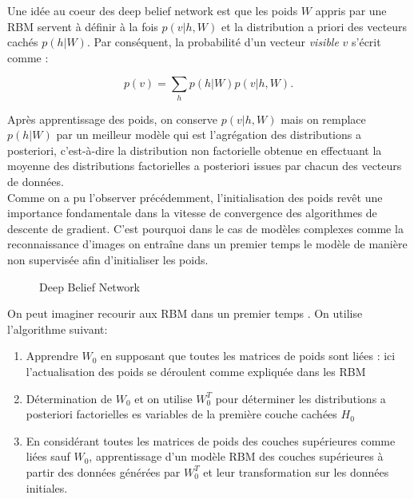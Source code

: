 \documentclass{article}
\theoremstyle{definition}
\begin{document}
\noindent Une idée au coeur des deep belief network est que les poids $W$ appris par une RBM servent à définir à la fois $p(v|h,W)$ et la distribution a priori des vecteurs cachés $p(h|W)$. Par conséquent, la probabilité d'un vecteur \textit{visible} $v$ s'écrit comme :

\[p(v)=\displaystyle \sum_h p(h|W)p(v|h,W).\]

\noindent Après apprentissage des poids, on conserve $p(v|h,W)$ mais on remplace $p(h|W)$ par un meilleur modèle qui est l'agrégation des distributions a posteriori, c'est-à-dire la distribution non factorielle obtenue en effectuant la moyenne des distributions factorielles a posteriori issues par chacun des vecteurs de données.\\

\noindent Comme on a pu l'observer précédemment, l'initialisation des poids revêt une importance fondamentale dans la vitesse de convergence des algorithmes de descente de gradient. C'est pourquoi dans le cas de modèles complexes comme la reconnaissance d'images on entraîne dans un premier temps le modèle de manière non supervisée afin d'initialiser les poids.\\

\begin{figure}[h!]\centering
{}
\caption{Deep Belief Network}
\label{DBN}
\end{figure}

\noindent On peut imaginer recourir aux RBM dans un premier temps . On utilise l'algorithme suivant:
\begin{enumerate}
\item Apprendre $W_0$ en supposant que toutes les matrices de poids sont liées : ici l'actualisation des poids se déroulent comme expliquée dans les RBM
\item Détermination de $W_0$ et on utilise $W_0^T$ pour déterminer les distributions a posteriori factorielles es variables de la première couche cachées $H_0$
\item En considérant toutes les matrices de poids des couches supérieures comme liées sauf $W_0$, apprentissage d'un modèle RBM des couches supérieures à partir des données générées par $W_0^T$ et leur transformation sur les données initiales.
\end{enumerate}
\end{document}
